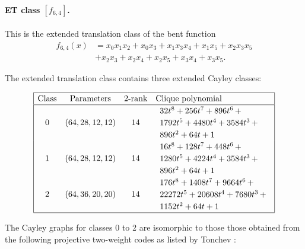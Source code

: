 \documentclass[12pt,a4paper]{article}
\begin{document}
\paragraph*{ET class $[f_{6,4}]$.}

This is the extended translation class of the bent function
\begin{align*}
f_{6,4}(x) &= x_{0} x_{1} x_{2} + x_{0} x_{3} + x_{1} x_{3} x_{4} + x_{1} x_{5} + x_{2} x_{3} x_{5}
\\
           &+ x_{2} x_{3} + x_{2} x_{4} + x_{2} x_{5} + x_{3} x_{4} + x_{3} x_{5}.
\end{align*}

The extended translation class contains
three extended Cayley classes:
\small{}

\begin{align*}
\def\arraystretch{1.2}
\begin{array}{|cccl|}
\hline
\text{Class} &
\text{Parameters} &
\text{2-rank} &
\text{Clique polynomial}
\\
\hline
0 &
(64, 28, 12, 12) &
14 &
\begin{array}{l}
32t^{8} + 256t^{7} + 896t^{6}
\,+
\\
 1792t^{5} + 4480t^{4} + 3584t^{3}
\,+
\\
 896t^{2} + 64t + 1
\end{array}
\\
1 &
(64, 28, 12, 12) &
14 &
\begin{array}{l}
16t^{8} + 128t^{7} + 448t^{6}
\,+
\\
 1280t^{5} + 4224t^{4} + 3584t^{3}
\,+
\\
 896t^{2} + 64t + 1
\end{array}
\\
2 &
(64, 36, 20, 20) &
14 &
\begin{array}{l}
176t^{8} + 1408t^{7} + 9664t^{6}
\,+
\\
 22272t^{5} + 20608t^{4} + 7680t^{3}
\,+
\\
 1152t^{2} + 64t + 1
\end{array}
\\
\hline
\end{array}
\end{align*}

The Cayley graphs for classes 0 to 2 are isomorphic to those those obtained from the following
projective two-weight
codes as listed by Tonchev \cite{Ton07codes}:
\end{document}
